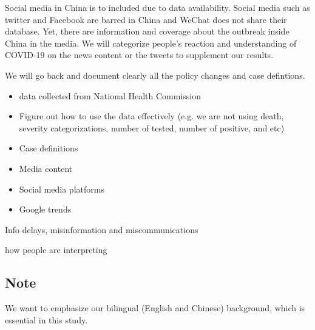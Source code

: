
Social media in China is to included due to data availability.   Social media such as twitter and Facebook are barred in China and WeChat does not share their database. Yet, there are information and coverage about the outbreak inside China in the media.  We will categorize people’s reaction and understanding of COVID-19  on the news content or the tweets to supplement our results.



We will go back and document clearly all the policy changes and case defintions. 

\begin{itemize}
\item{data collected from National Health Commission}
\item{Figure out how to use the data effectively (e.g. we are not using death, severity categorizations, number of tested, number of positive, and etc)}
\item{Case definitions}
\item{Media content}
\item{Social media platforms}
\item{Google trends}
\end{itemize}


Info delays, misinformation and miscommunications


how people are interpreting 


\subsection{Note}
We want to emphasize our bilingual (English and Chinese) background, which is essential in this study.



